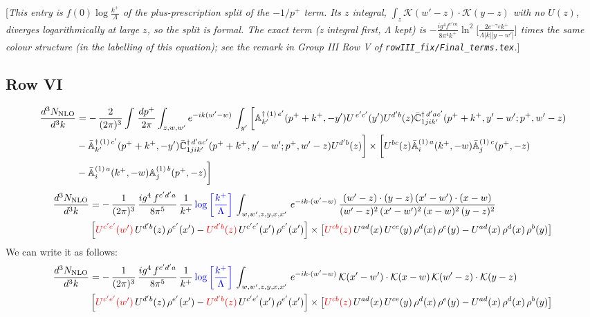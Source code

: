 \documentclass[9pt]{article}
\def\mf#1{\mathbb{#1}}
\newcommand{\chg}[1]{{\color{red}#1}}
\newcommand{\rnote}[1]{{\color{teal}[\textit{#1}]}}
\numberwithin{equation}{section}
\begin{document}
\rnote{This entry is $f(0)\log\frac{k^{+}}{\Lambda}$ of the plus-prescription split of the $-1/p^{+}$ term. Its $z$ integral, $\int_{z}\mathcal{K}(w'-z)\cdot\mathcal{K}(y-z)$ with no $U(z)$, diverges logarithmically at large $z$, so the split is formal. The exact term (z integral first, $\Lambda$ kept) is $-\frac{ig^{4}f^{c'ca}}{8\pi^{4}k^{+}}\ln^{2}\!\big[\frac{2e^{-\gamma_{E}}k^{+}}{\Lambda|k||y-w'|}\big]$ times the same colour structure (in the labelling of this equation); see the remark in Group III Row V of \texttt{rowIII\_fix/Final\_terms.tex}.}
\subsection{Row VI}
\begin{align}
     \frac{d^{3}N_{\rm NLO}}{d^{3}k} & =   -\,\frac{2}{(2\pi)^{3}} \int\, \frac{dp^{+}}{2\pi}\int_{z,w,w^{\prime}} e^{-ik(w^{\prime}-w)}\, \int_{y^{\prime}}\bigg[\mf{A}^{\dagger\, (1)\,e^{\prime}}_{k^{\prime}}(p^{+}+k^{+},-y^{\prime})U^{\, e^{\prime}c^{\prime}}(y^{\prime})U^{d^{\prime}b}(z) \Bar{\mf{C}}^{\dagger\, d^{\prime}ac^{\prime}}_{1jik^{\prime}}(p^{+}+k^{+},y^{\prime}-w^{\prime}; p^{+},w^{\prime}-z) \notag \\ & -\Bar{\mf{A}}^{\dagger\, (1)\,c^{\prime}}_{k^{\prime}}(p^{+}+k^{+},-y^{\prime})\Bar{\mf{C}}^{\dagger\, d^{\prime}ac^{\prime}}_{1jik^{\prime}}(p^{+}+k^{+},y^{\prime}-w^{\prime}; p^{+},w^{\prime}-z)U^{d^{\prime}b}(z)\bigg] \times \bigg[U^{bc}(z)\Bar{\mf{A}}^{(1)\, a}_{i}(k^{+},- w)\Bar{\mf{A}}^{(1)\, c}_{j}(p^{+},-z)\notag \\ & -\Bar{\mf{A}}^{(1)\, a}_{i}(k^{+},- w) \mf{A}^{(1)\, b}_{j}(p^{+},- z)\bigg]\nonumber
\end{align}
\begin{align}
    \frac{d^{3}N_{\rm NLO}}{d^{3}k} & = -\,\frac{1}{(2\pi)^{3}}\, \frac{ig^{4}\,f^{c'd'a}}{8\pi^{5}}\, \frac{1}{k^{+}}\,{\color{blue}\log{\left[\frac{k^{+}}{\Lambda}\right]}}\, \int_{w,w',z,y,x,x'}\, e^{-ik\cdot (w'-w)}\,\frac{(w'-z)\cdot (y-z)\,(x'-w')\cdot (x-w)}{(w'-z)^{2}\,(x'-w')^{2}\,(x-w)^{2}\,(y-z)^{2}}\notag \\ & \left[\chg{U^{c'e'}(w')}\,U^{d'b}(z)\,\rho^{e'}(x')-\chg{U^{d'b}(z)}\,U^{c'e'}(x')\,\rho^{e'}(x')\right]\times  \left[\chg{U^{cb}(z)}\,U^{ad}(x)\,U^{ce}(y)\,\rho^{d}(x)\,\rho^{e}(y)-U^{ad}(x)\,\rho^{d}(x)\,\rho^{b}(y)\right]
\end{align}
We can write it as follows:
\begin{align}
    \frac{d^{3}N_{\rm NLO}}{d^{3}k} & = -\,\frac{1}{(2\pi)^{3}}\, \frac{ig^{4}\,f^{c'd'a}}{8\pi^{5}}\, \frac{1}{k^{+}}\,{\color{blue}\log{\left[\frac{k^{+}}{\Lambda}\right]}}\, \int_{w,w',z,y,x,x'}\, e^{-ik\cdot (w'-w)}\,\mathcal{K}(x'-w')\cdot \mathcal{K}(x-w)\,\mathcal{K}(w'-z)\cdot \mathcal{K}(y-z)\notag \\ & \left[\chg{U^{c'e'}(w')}\,U^{d'b}(z)\,\rho^{e'}(x')-\chg{U^{d'b}(z)}\,U^{c'e'}(x')\,\rho^{e'}(x')\right]\times  \left[\chg{U^{cb}(z)}\,U^{ad}(x)\,U^{ce}(y)\,\rho^{d}(x)\,\rho^{e}(y)-U^{ad}(x)\,\rho^{d}(x)\,\rho^{b}(y)\right]
\end{align}
\end{document}
